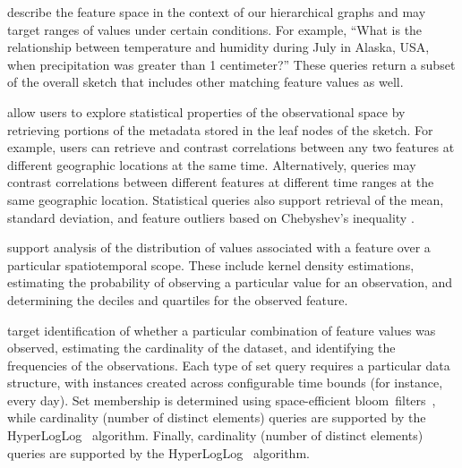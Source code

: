 \begin{description}[leftmargin=*]
    \item[Relational Queries] describe the feature space in the context of our hierarchical graphs and may target ranges of values under certain conditions. For example, ``What is the relationship between temperature and humidity during July in Alaska, USA, when precipitation was greater than 1 centimeter?'' These queries return a subset of the overall sketch that includes other matching feature values as well.

    \item[Statistical Queries] allow users to explore statistical properties of the observational space by retrieving portions of the metadata stored in the leaf nodes of the sketch. For example, users can retrieve and contrast correlations between any two features at different geographic locations at the same time. Alternatively, queries may contrast correlations between different features at different time ranges at the same geographic location. Statistical queries also support retrieval of the mean, standard deviation, and feature outliers based on Chebyshev's inequality \cite{knuth1968art}.

    \item[Density Queries] support analysis of the distribution of values associated with a feature over a particular spatiotemporal scope. These include kernel density estimations, estimating the probability of observing a particular value for an observation, and determining the deciles and quartiles for the observed feature.%

    \item[Set Queries] target identification of whether a particular combination of feature values was observed, estimating the cardinality of the dataset, and identifying the frequencies of the observations. Each type of set query requires a particular data structure, with instances created across configurable time bounds (for instance, every day). Set membership is determined using space-efficient bloom~filters~\cite{bloom1970space}, while cardinality (number of distinct elements) queries are supported by the HyperLogLog~\cite{flajolet2007hyperloglog} algorithm. Finally, cardinality (number of distinct elements) queries are supported by the HyperLogLog~\cite{flajolet2007hyperloglog} algorithm.


\end{description}
